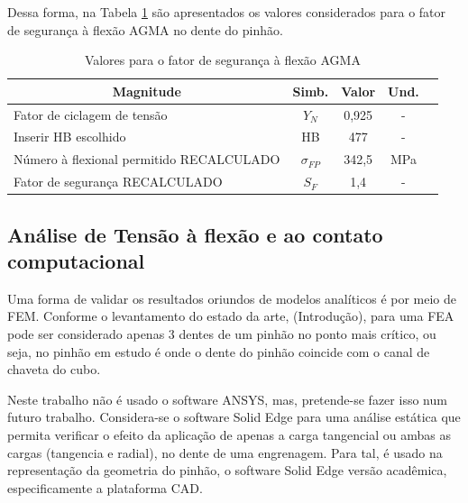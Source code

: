 \documentclass[12pt,a4paper]{article}
\begin{document}
Dessa forma, na Tabela {\ref{tab:7}} são apresentados
os valores considerados para o fator de segurança à flexão AGMA no dente
do pinhão.

\begin{table}[!htb]
\centering
\caption{{\label{tab:7} Valores para o fator de segurança à flexão AGMA}}
\begin{tabular}{l c c c c}
\hline
\multicolumn{1}{c}{\textbf{Magnitude}}       & \textbf{Simb.}  & \textbf{Valor} & \textbf{Und.} \\ \hline
Fator de ciclagem de tensão                  & $Y_N$             & 0,925          & -            \\
Inserir HB escolhido                         & HB              & 477            & -            \\
Número à flexional permitido RECALCULADO     & $\sigma_{FP}$    & 342,5          & MPa             \\
Fator de segurança RECALCULADO               & $S_F$              & 1,4            & -             \\ \hline     
\end{tabular}
\end{table}

\subsection*{}

{\label{anuxe1lise-de-tensuxe3o-uxe0-flexuxe3o-e-ao-contato-computacional}}

\subsection*{Análise de Tensão à flexão e ao contato
computacional}

{\label{anuxe1lise-de-tensuxe3o-uxe0-flexuxe3o-e-ao-contato-computacional}}

Uma forma de validar os resultados oriundos de modelos analíticos é por
meio de FEM. Conforme o levantamento do estado da arte, (Introdução),
para uma FEA pode ser considerado apenas 3 dentes de um pinhão no ponto
mais crítico, ou seja, no pinhão em estudo é onde o dente do pinhão
coincide com o canal de chaveta do cubo.

Neste trabalho não é usado o software ANSYS, mas, pretende-se fazer isso
num futuro trabalho. Considera-se o software Solid Edge para uma análise
estática que permita verificar o efeito da aplicação de apenas a carga
tangencial ou ambas as cargas (tangencia e radial), no dente de uma
engrenagem. Para tal, é usado na representação da geometria do pinhão, o
software Solid Edge versão acadêmica, especificamente a plataforma CAD.
\end{document}
